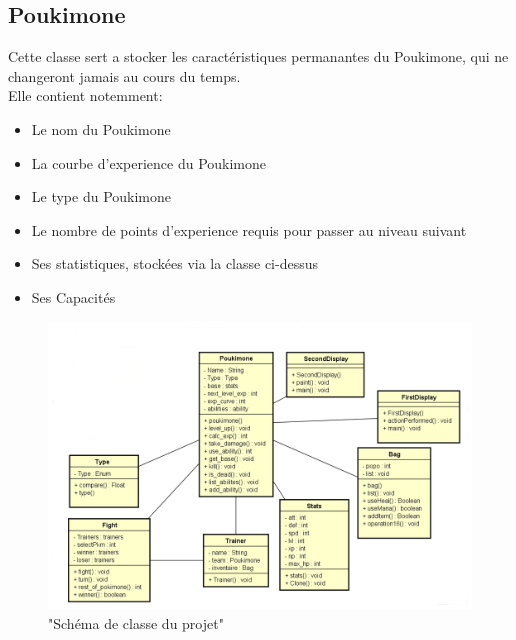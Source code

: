 \documentclass{report}
\begin{document}
\subsection*{Poukimone}
Cette classe sert a stocker les caractéristiques permanantes du Poukimone, qui ne changeront jamais au cours du temps.\\ 
Elle contient notemment:\\
\begin{itemize}
    \item{Le nom du Poukimone}
    \item{La courbe d'experience du Poukimone}
    \item{Le type du Poukimone}
    \item{Le nombre de points d'experience requis pour passer au niveau suivant}
    \item{Ses statistiques, stockées via la classe ci-dessus}
    \item{Ses Capacités}
\end{itemize}


\begin{figure}[ht!]
    \centering
    \includegraphics[width=125mm]{Q1.png}
    \caption{"Schéma de classe du projet"}
\end{figure}
\newpage
\end{document}
